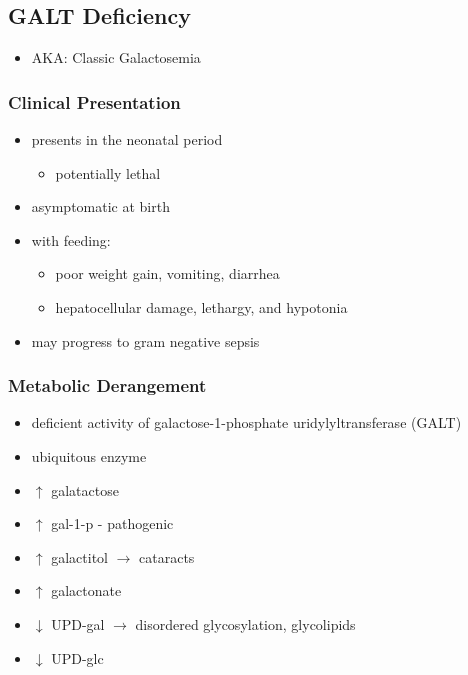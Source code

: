 \documentclass{scrartcl}
\begin{document}
\subsection{GALT Deficiency}
\label{sec:org2d0f74f}
\begin{itemize}
\item AKA: Classic Galactosemia
\end{itemize}
\subsubsection{Clinical Presentation}
\label{sec:org622ee10}
\begin{itemize}
\item presents in the neonatal period
\begin{itemize}
\item potentially lethal
\end{itemize}
\item asymptomatic at birth
\item with feeding:
\begin{itemize}
\item poor weight gain, vomiting, diarrhea
\item hepatocellular damage, lethargy, and hypotonia
\end{itemize}
\item may progress to gram negative sepsis
\end{itemize}


\subsubsection{Metabolic Derangement}
\label{sec:org07381ff}
\begin{itemize}
\item deficient activity of galactose-1-phosphate uridylyltransferase (GALT)
\item ubiquitous enzyme
\item \(\uparrow\)  galatactose
\item \(\uparrow\) gal-1-p - pathogenic
\item \(\uparrow\) galactitol \(\to\) cataracts
\item \(\uparrow\) galactonate
\item \(\downarrow\) UPD-gal \(\to\) disordered glycosylation, glycolipids
\item \(\downarrow\) UPD-glc
\end{itemize}
\end{document}
